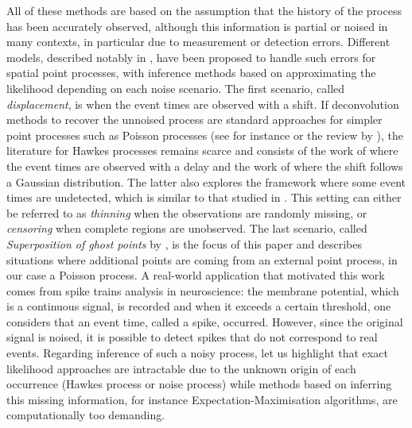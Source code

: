         All of these methods are based on the assumption that the history of the process has been accurately observed, although this information is partial or noised in many contexts, in particular due to measurement or detection errors.
        Different models, described notably in \textcite{Lund2000}, have been proposed to handle such errors for spatial point processes, with inference methods based on approximating the likelihood depending on each noise scenario.
            The first scenario, called \textit{displacement}, is when the event times are observed with a shift. If deconvolution methods to recover the unnoised process are standard approaches for simpler point processes such as Poisson processes (see for instance \textcite{Antoniadis2006,Bonnet2022} or the review by \textcite{Hohage2016}), the literature for Hawkes processes remains scarce and consists of the work of \textcite{Trouleau2019} where the event times are observed with a delay and the work of \textcite{Deutsch2020} where the shift follows a Gaussian distribution. The latter also explores the framework where some event times are undetected, which is similar to that studied in \textcite{Mei2019}. This setting can either be referred to as \textit{thinning} when the observations are randomly missing, or \textit{censoring} when complete regions are unobserved. The last scenario, called \textit{Superposition of ghost points} by \textcite{Lund2000}, is the focus of this paper and describes situations where additional points are coming from an external point process, in our case a Poisson process.   A real-world application that motivated this work comes from spike trains analysis in neuroscience: the membrane potential, which is a continuous signal, is recorded and when it exceeds a certain threshold, one considers that an event time, called a spike, occurred. However, since the original signal is noised, it is possible to detect spikes that do not correspond to real events.
          Regarding inference of such a noisy process, let us highlight that exact likelihood approaches are intractable due to the unknown origin of each occurrence (Hawkes process or noise process) while methods based on inferring this missing information, for instance Expectation-Maximisation algorithms, are computationally too demanding.
               
